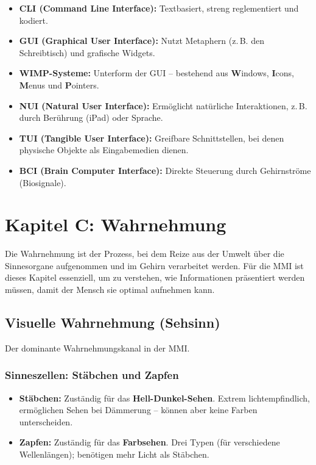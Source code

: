 \documentclass[12pt, a4paper]{article}
\begin{document}
\begin{itemize}
  \item \textbf{CLI (Command Line Interface):} Textbasiert, streng reglementiert
        und kodiert.
  \item \textbf{GUI (Graphical User Interface):} Nutzt Metaphern (z.\,B. den
        \glqq{}Schreibtisch\grqq{}) und grafische Widgets.
  \item \textbf{WIMP-Systeme:} Unterform der GUI -- bestehend aus
        \textbf{W}indows, \textbf{I}cons, \textbf{M}enus und \textbf{P}ointers.
  \item \textbf{NUI (Natural User Interface):} Ermöglicht \glqq{}natürliche\grqq{} Interaktionen,
        z.\,B. durch Berührung (iPad) oder Sprache.
  \item \textbf{TUI (Tangible User Interface):} Greifbare Schnittstellen, bei denen
        physische Objekte als Eingabemedien dienen.
  \item \textbf{BCI (Brain Computer Interface):} Direkte Steuerung durch
        Gehirnströme (Biosignale).
\end{itemize}

\section{Kapitel C: Wahrnehmung}

Die Wahrnehmung ist der Prozess, bei dem Reize aus der Umwelt über die Sinnesorgane
aufgenommen und im Gehirn verarbeitet werden. Für die MMI ist dieses Kapitel essenziell,
um zu verstehen, wie Informationen präsentiert werden müssen, damit der Mensch sie
optimal aufnehmen kann.

\subsection{Visuelle Wahrnehmung (Sehsinn)}

Der dominante Wahrnehmungskanal in der MMI.

\subsubsection{Sinneszellen: Stäbchen und Zapfen}

\begin{itemize}
  \item \textbf{Stäbchen:} Zuständig für das \textbf{Hell-Dunkel-Sehen}. Extrem
        lichtempfindlich, ermöglichen Sehen bei Dämmerung -- können aber keine
        Farben unterscheiden.
  \item \textbf{Zapfen:} Zuständig für das \textbf{Farbsehen}. Drei Typen (für
        verschiedene Wellenlängen); benötigen mehr Licht als Stäbchen.
\end{itemize}
\end{document}
